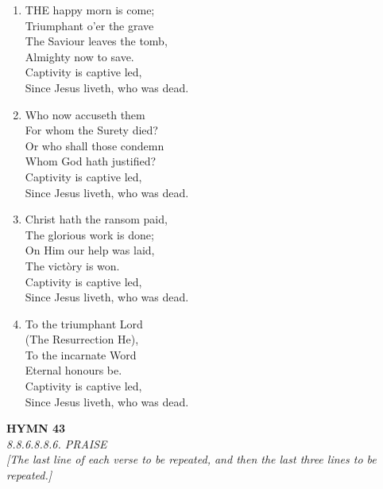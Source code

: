 \begin{enumerate}
    \item THE happy morn is come; \\
        Triumphant o'er the grave \\
        The Saviour leaves the tomb, \\
        Almighty now to save. \\
        Captivity is captive led, \\
        Since Jesus liveth, who was dead.

    \item Who now accuseth them \\
        For whom the Surety died? \\
        Or who shall those condemn \\
        Whom God hath justified? \\
        Captivity is captive led, \\
        Since Jesus liveth, who was dead.

    \item Christ hath the ransom paid, \\
        The glorious work is done; \\
        On Him our help was laid, \\
        The vict\`ory is won. \\
        Captivity is captive led, \\
        Since Jesus liveth, who was dead.

    \item To the triumphant Lord \\
        (The Resurrection He), \\
        To the incarnate Word \\
        Eternal honours be. \\
        Captivity is captive led, \\
        Since Jesus liveth, who was dead.

\end{enumerate}

\newpage
\begin{center}
    {\Large \textbf{HYMN 43}}
    \\
    \textit{8.8.6.8.8.6. PRAISE}
    \\
    \textit{\small [The last line of each verse to be repeated, and then the last three lines to be repeated.]}
\end{center}
\vspace{1em}

